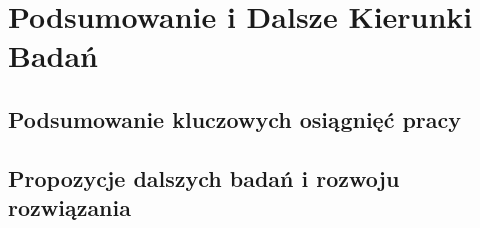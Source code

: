\newpage
\section{Podsumowanie i Dalsze Kierunki Badań}

\subsection{Podsumowanie kluczowych osiągnięć pracy}

\subsection{Propozycje dalszych badań i rozwoju rozwiązania}